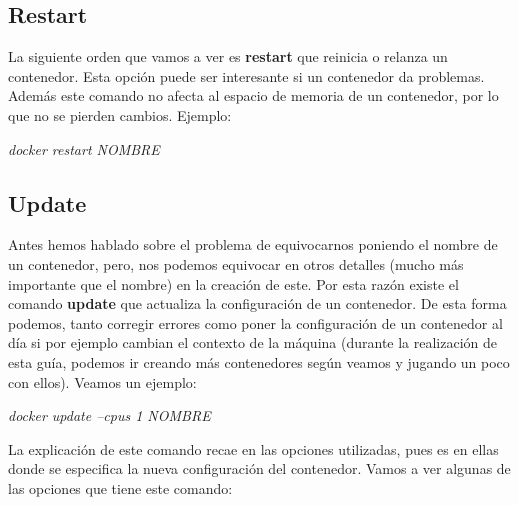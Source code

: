 \documentclass[]{article}
\begin{document}
\subsection{Restart}
La siguiente orden que vamos a ver es \textbf{restart} que reinicia o relanza un contenedor.
Esta opción puede ser interesante si un contenedor da problemas. Además este comando no afecta al espacio de memoria de un contenedor, por lo que no se pierden cambios.
Ejemplo:
\begin{center}
\it docker restart NOMBRE
\end{center}

\subsection{Update}
Antes hemos hablado sobre el problema de equivocarnos poniendo el nombre de un contenedor, pero, nos podemos equivocar en otros detalles (mucho más importante que el nombre) en la creación de este. Por esta razón existe el comando \textbf{update} que actualiza la configuración de un contenedor. De esta forma podemos, tanto corregir errores como poner la configuración de un contenedor al día si por ejemplo cambian el contexto de la máquina (durante la realización de esta guía, podemos ir creando más contenedores según veamos y jugando un poco con ellos).
Veamos un ejemplo:
\begin{center}
	\it
	docker update --cpus 1 NOMBRE
\end{center}
La explicación de este comando recae en las opciones utilizadas, pues es en ellas donde se especifica la nueva configuración del contenedor.
Vamos a ver algunas de las opciones que tiene este comando:
\end{document}

